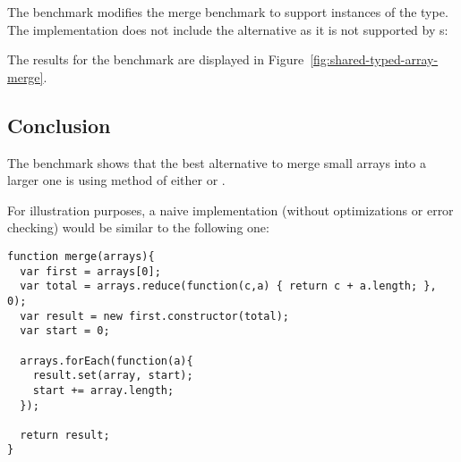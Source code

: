 The benchmark modifies the \ttarray{} merge benchmark to support instances of the \tstarray{} type. The implementation does not include the \dataview{} alternative as it is not supported by \tstarray{}s:

The results for the benchmark are displayed in Figure~\ref{fig:shared-typed-array-merge}.

\subsection{Conclusion}
The benchmark shows that the best alternative to merge small arrays into a larger one is using  method of either \ttarray{} or \tstarray{}.

For illustration purposes, a naive implementation (without optimizations or error checking) would be similar to the following one:
\begin{lstlisting}[caption=Simple \ttarray{} merge function]
function merge(arrays){
  var first = arrays[0];
  var total = arrays.reduce(function(c,a) { return c + a.length; }, 0);
  var result = new first.constructor(total);
  var start = 0;

  arrays.forEach(function(a){
    result.set(array, start);
    start += array.length;
  });

  return result;
}
\end{lstlisting}

\pagebreak